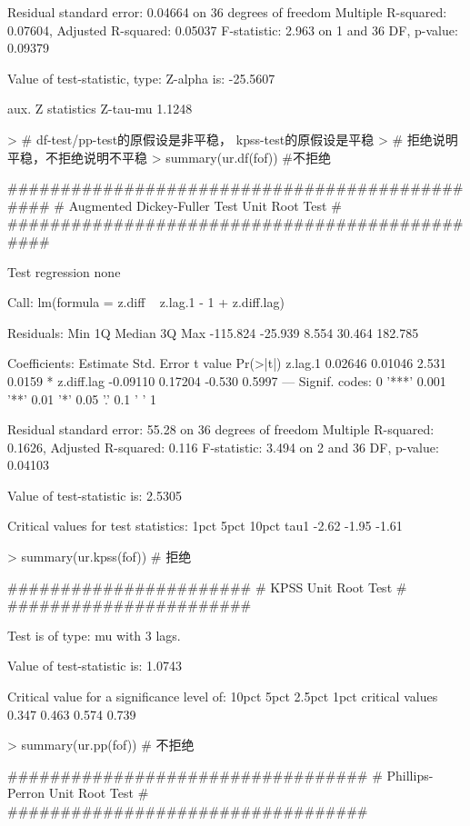 \documentclass{article}
\begin{document}
\begin{Schunk}
\begin{Soutput}
Residual standard error: 0.04664 on 36 degrees of freedom
Multiple R-squared:  0.07604,	Adjusted R-squared:  0.05037 
F-statistic: 2.963 on 1 and 36 DF,  p-value: 0.09379


Value of test-statistic, type: Z-alpha  is: -25.5607 

         aux. Z statistics
Z-tau-mu            1.1248
\end{Soutput}
\begin{Sinput}
> # df-test/pp-test的原假设是非平稳， kpss-test的原假设是平稳
> # 拒绝说明平稳，不拒绝说明不平稳
> summary(ur.df(fof)) #不拒绝
\end{Sinput}
\begin{Soutput}
############################################### 
# Augmented Dickey-Fuller Test Unit Root Test # 
############################################### 

Test regression none 


Call:
lm(formula = z.diff ~ z.lag.1 - 1 + z.diff.lag)

Residuals:
     Min       1Q   Median       3Q      Max 
-115.824  -25.939    8.554   30.464  182.785 

Coefficients:
           Estimate Std. Error t value Pr(>|t|)  
z.lag.1     0.02646    0.01046   2.531   0.0159 *
z.diff.lag -0.09110    0.17204  -0.530   0.5997  
---
Signif. codes:  0 '***' 0.001 '**' 0.01 '*' 0.05 '.' 0.1 ' ' 1

Residual standard error: 55.28 on 36 degrees of freedom
Multiple R-squared:  0.1626,	Adjusted R-squared:  0.116 
F-statistic: 3.494 on 2 and 36 DF,  p-value: 0.04103


Value of test-statistic is: 2.5305 

Critical values for test statistics: 
      1pct  5pct 10pct
tau1 -2.62 -1.95 -1.61
\end{Soutput}
\begin{Sinput}
> summary(ur.kpss(fof)) # 拒绝
\end{Sinput}
\begin{Soutput}
####################### 
# KPSS Unit Root Test # 
####################### 

Test is of type: mu with 3 lags. 

Value of test-statistic is: 1.0743 

Critical value for a significance level of: 
                10pct  5pct 2.5pct  1pct
critical values 0.347 0.463  0.574 0.739
\end{Soutput}
\begin{Sinput}
> summary(ur.pp(fof)) # 不拒绝
\end{Sinput}
\begin{Soutput}
################################## 
# Phillips-Perron Unit Root Test # 
################################## 


\end{Soutput}
\end{Schunk}
\end{document}
